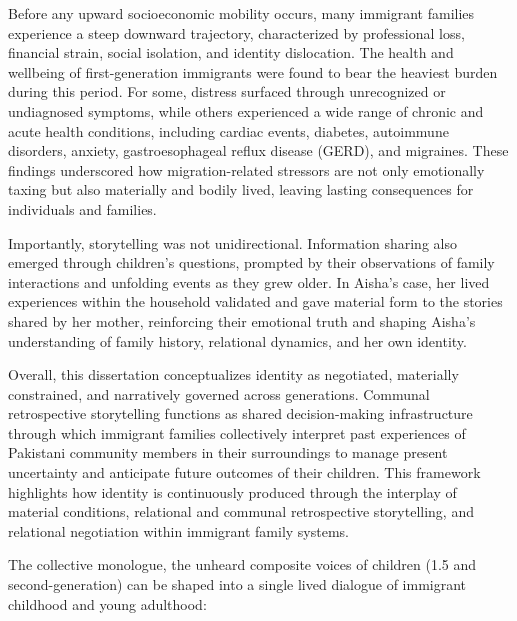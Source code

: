 Before any upward socioeconomic mobility occurs, many immigrant families experience a steep downward trajectory, characterized by professional loss, financial strain, social isolation, and identity dislocation. The health and wellbeing of first-generation immigrants were found to bear the heaviest burden during this period. For some, distress surfaced through unrecognized or undiagnosed symptoms, while others experienced a wide range of chronic and acute health conditions, including cardiac events, diabetes, autoimmune disorders, anxiety, gastroesophageal reflux disease (GERD), and migraines. These findings underscored how migration-related stressors are not only emotionally taxing but also materially and bodily lived, leaving lasting consequences for individuals and families.

Importantly, storytelling was not unidirectional. Information sharing also emerged through children’s questions, prompted by their observations of family interactions and unfolding events as they grew older. In Aisha’s case, her lived experiences within the household validated and gave material form to the stories shared by her mother, reinforcing their emotional truth and shaping Aisha’s understanding of family history, relational dynamics, and her own identity.

Overall, this dissertation conceptualizes identity as negotiated, materially constrained, and narratively governed across generations. Communal retrospective storytelling functions as shared decision-making infrastructure through which immigrant families collectively interpret past experiences of Pakistani community members in their surroundings to manage present uncertainty and anticipate future outcomes of their children. This framework highlights how identity is continuously produced through the interplay of material conditions, relational and communal retrospective storytelling, and relational negotiation within immigrant family systems.

The collective monologue, the unheard composite voices of children (1.5 and second-generation) can be shaped into a single lived dialogue of immigrant childhood and young adulthood:

